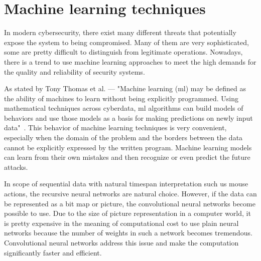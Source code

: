 \section{Machine learning techniques}\label{sec:machine-learning-techniques}
In modern cybersecurity, there exist many different threats that potentially expose the system to being compromised.
Many of them are very sophisticated, some are pretty difficult to distinguish from legitimate operations.
Nowadays, there is a trend to use machine learning approaches to meet the high demands for the quality and reliability of security systems.

As stated by Tony Thomas et al. --- "Machine learning (\gls{ml}) may be defined as the ability of machines to learn without being explicitly programmed.
Using mathematical techniques across cyberdata, \gls{ml} algorithms can build models of behaviors and use those models as a basis for making predictions on newly input data"~\cite{thomas2020machine}.
This behavior of machine learning techniques is very convenient, especially when the domain of the problem and the borders between the data cannot be explicitly expressed by the written program.
Machine learning models can learn from their own mistakes and then recognize or even predict the future attacks.

In scope of sequential data with natural timespan interpretation such us mouse actions, the recursive neural networks are natural choice.
However, if the data can be represented as a bit map or picture, the convolutional neural networks become possible to use.
Due to the size of picture representation in a computer world, it is pretty expensive in the meaning of computational cost to use plain neural networks because the number of weights in such a network becomes tremendous.
Convolutional neural networks address this issue and make the computation significantly faster and efficient.

